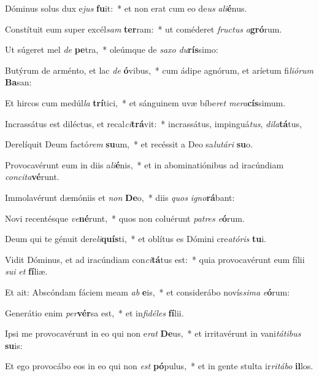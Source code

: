 \item Dóminus solus dux e\textit{jus} \textbf{fu}it:~* et non erat cum eo de\textit{us} \textit{a}\textit{li}\textbf{é}nus.
\item Constítuit eum super excél\textit{sam} \textbf{ter}ram:~* ut coméderet \textit{fruc}\textit{tus} \textit{a}\textbf{gró}rum.
\item Ut súgeret mel \textit{de} \textbf{pe}tra,~* oleúmque de \textit{sa}\textit{xo} \textit{du}\textbf{rís}simo:
\item Butýrum de arménto, et lac \textit{de} \textbf{ó}vibus,~* cum ádipe agnórum, et aríetum fi\textit{li}\textit{ó}\textit{rum} \textbf{Ba}san:
\item Et hircos cum medúl\textit{la} \textbf{trí}tici,~* et sánguinem uvæ bíbe\textit{ret} \textit{me}\textit{ra}\textbf{cís}simum.
\item Incrassátus est diléctus, et recal\textit{ci}\textbf{trá}vit:~* incrassátus, impinguá\textit{tus}, \textit{di}\textit{la}\textbf{tá}tus,
\item Derelíquit Deum factó\textit{rem} \textbf{su}um,~* et recéssit a Deo sa\textit{lu}\textit{tá}\textit{ri} \textbf{su}o.
\item Provocavérunt eum in diis a\textit{li}\textbf{é}nis,~* et in abominatiónibus ad iracúndiam \textit{con}\textit{ci}\textit{ta}\textbf{vé}runt.
\item Immolavérunt dæmóniis et \textit{non} \textbf{De}o,~* diis \textit{quos} \textit{i}\textit{gno}\textbf{rá}bant:
\item Novi recentésque \textit{ve}\textbf{né}runt,~* quos non coluérunt \textit{pa}\textit{tres} \textit{e}\textbf{ó}rum.
\item Deum qui te génuit dere\textit{li}\textbf{quís}ti,~* et oblítus es Dómini cre\textit{a}\textit{tó}\textit{ris} \textbf{tu}i.
\item Vidit Dóminus, et ad iracúndiam con\textit{ci}\textbf{tá}tus est:~* quia provocavérunt eum fílii \textit{su}\textit{i} \textit{et} \textbf{fí}liæ.
\item Et ait: Abscóndam fáciem meam \textit{ab} \textbf{e}is,~* et considerábo novís\textit{si}\textit{ma} \textit{e}\textbf{ó}rum:
\item Generátio enim \textit{per}\textbf{vér}sa est,~* et in\textit{fi}\textit{dé}\textit{les} \textbf{fí}lii.
\item Ipsi me provocavérunt in eo qui non e\textit{rat} \textbf{De}us,~* et irritavérunt in vani\textit{tá}\textit{ti}\textit{bus} \textbf{su}is:
\item Et ego provocábo eos in eo qui non \textit{est} \textbf{pó}pulus,~* et in gente stulta ir\textit{ri}\textit{tá}\textit{bo} \textbf{il}los.
